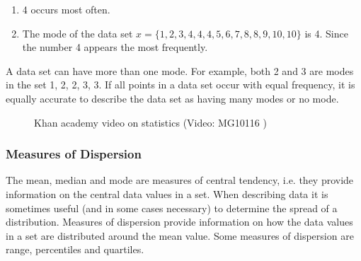 \begin{description}[noitemsep]
\begin{description}[noitemsep]
{\begin{mdframed}[linewidth=4, leftmargin=40, rightmargin=40]
\begin{exercise}
\begin{enumerate}[noitemsep, label=\textbf{Step} \textbf{\arabic*}. ]
\begin{table}
\begin{center}
\begin{xtabular}[t]{|l|l|l|l|}
    \end{xtabular}
      \end{center}
    \begin{center}{\small\bfseries Table 16.10}\end{center}
    \begin{caption}{\small\bfseries Table 16.10}\end{caption}
\end{table}
    \par
          \item  
          \label{m39400*id212553}4 occurs most often.\par 
          \item  
          \label{m39400*id212560}The mode of the data set $x=\{1,2,3,4,4,4,5,6,7,8,8,9,10,10\}$ is 4. Since the number 4 appears the most frequently. \par 
          \end{enumerate}
    \end{exercise}
    \end{mdframed}
    }
    \noindent
          \label{m39400*id212650}A data set can have more than one mode. For example, both 2 and 3 are modes in the set 1, 2, 2, 3, 3. If all points in a data set occur with equal frequency, it is equally accurate to describe the data set as having many modes or no mode.\par 
        \label{m39400*eip-977}
    \setcounter{subfigure}{0}
	\begin{figure}[H] %
    \textnormal{Khan academy video on statistics}\vspace{.1in} \nopagebreak
  \label{m39400*yt-media1}\label{m39400*yt-video1}
             { (Video:  MG10116 )}
      \vspace{2pt}
    \vspace{.1in}
 \end{figure}       \par 
      \label{m39400*uid70}
            \subsubsection{ Measures of Dispersion}
            \nopagebreak
        \label{m39400*id212665}The mean, median and mode are measures of central tendency, i.e. they provide information on the central data values in a set. When describing data it is sometimes useful (and in some cases necessary) to determine the spread of a distribution. Measures of dispersion provide information on how the data values in a set are distributed around the mean value. Some measures of dispersion are range, percentiles and quartiles.\par 
        \label{m39400*uid71}

\end{description}
\end{description}
